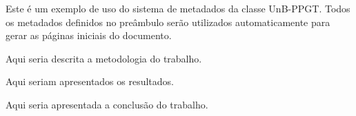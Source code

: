 \documentclass[mestrado,onehalfspacing,hyperref]{UnB-PPGT}
\begin{document}


Este é um exemplo de uso do sistema de metadados da classe UnB-PPGT.
Todos os metadados definidos no preâmbulo serão utilizados automaticamente
para gerar as páginas iniciais do documento.


Aqui seria descrita a metodologia do trabalho.


Aqui seriam apresentados os resultados.


Aqui seria apresentada a conclusão do trabalho.
\end{document}
